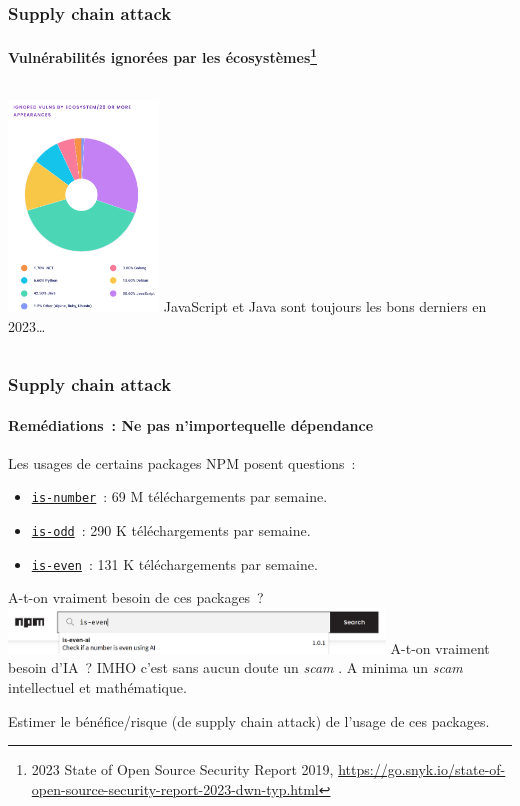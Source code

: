 \documentclass{beamer}
\begin{document}
    \begin{frame}
        \frametitle{Supply chain attack}
        \framesubtitle{Vulnérabilités ignorées par les écosystèmes\footnote{\label{snyk2023}2023 State of Open Source Security Report 2019, \url{https://go.snyk.io/state-of-open-source-security-report-2023-dwn-typ.html}}}
        \transdissolve
        \centering
        \begin{columns}
            \includegraphics[width=4cm]{image/vuln-by-ecosystem}
            JavaScript et Java sont toujours les bons derniers en 2023\ldots
        \end{columns}
    \end{frame}

    \begin{frame}
        \frametitle{Supply chain attack}
        \framesubtitle{Remédiations~: Ne pas  n'importequelle dépendance}
        \transdissolve
        Les usages de certains packages NPM posent questions~:
        \begin{itemize}
            \item \href{https://www.npmjs.com/package/is-number}{\lstinline{is-number}}~: 69 M téléchargements par semaine.
            \item \href{https://www.npmjs.com/package/is-odd}{\lstinline{is-odd}}~: 290 K téléchargements par semaine.
            \item \href{https://www.npmjs.com/package/is-even}{\lstinline{is-even}}~: 131 K téléchargements par semaine.
        \end{itemize}
        A-t-on vraiment besoin de ces packages~?
        \bigbreak
        \centering
        \includegraphics[width=10cm]{image/ai-everywhere}
        \flushleft
        \bigbreak
        A-t-on vraiment besoin d'IA~?
        \bigbreak
        IMHO c'est sans aucun doute un \textit{scam} .
        A minima un \textit{scam} intellectuel et mathématique.
        \begin{dangercolorbox}
            Estimer le bénéfice/risque (de supply chain attack) de l'usage de ces packages.
        \end{dangercolorbox}
    \end{frame}
\end{document}

